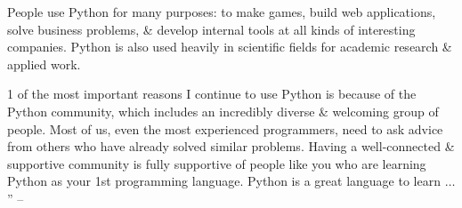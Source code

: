 \documentclass[oneside]{book}
\numberwithin{equation}{section}
\begin{document}
People use Python for many purposes: to make games, build web applications, solve business problems, \& develop internal tools at all kinds of interesting companies. Python is also used heavily in scientific fields for academic research \& applied work.

1 of the most important reasons I continue to use Python is because of the Python community, which includes an incredibly diverse \& welcoming group of people.  Most of us, even the most experienced programmers, need to ask advice from others who have already solved similar problems. Having a well-connected \& supportive community is fully supportive of people like you who are learning Python as your 1st programming language. Python is a great language to learn $\ldots$'' -- \cite[Introduction, p. xxxvi]{Matthes2019}

\end{document}
